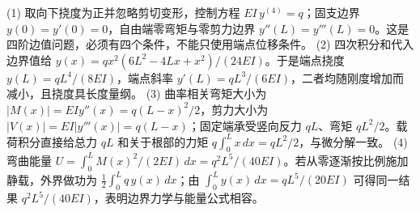 (1) 取向下挠度为正并忽略剪切变形，控制方程 \(EI\,y^{(4)}=q\)；固支边界 \(y(0)=y'(0)=0\)，自由端零弯矩与零剪力边界 \(y''(L)=y'''(L)=0\)。这是四阶边值问题，必须有四个条件，不能只使用端点位移条件。
(2) 四次积分和代入边界值给 \(y(x)=q x^2(6L^2-4Lx+x^2)/(24EI)\)。于是端点挠度 \(y(L)=qL^4/(8EI)\)，端点斜率 \(y'(L)=qL^3/(6EI)\)，二者均随刚度增加而减小，且挠度具长度量纲。
(3) 曲率相关弯矩大小为 \(|M(x)|=EI y''(x)=q(L-x)^2/2\)，剪力大小为 \(|V(x)|=EI|y'''(x)|=q(L-x)\)；固定端承受竖向反力 \(qL\)、弯矩 \(qL^2/2\)。载荷积分直接给总力 \(qL\) 和关于根部的力矩 \(q\int_0^Lx\,dx=qL^2/2\)，与微分解一致。
(4) 弯曲能量 \(U=\int_0^L M(x)^2/(2EI)\,dx=q^2L^5/(40EI)\)。若从零逐渐按比例施加静载，外界做功为 \(\frac12\int_0^Lq\,y(x)\,dx\)；由 \(\int_0^Ly(x)\,dx=qL^5/(20EI)\) 可得同一结果 \(q^2L^5/(40EI)\)，表明边界力学与能量公式相容。
